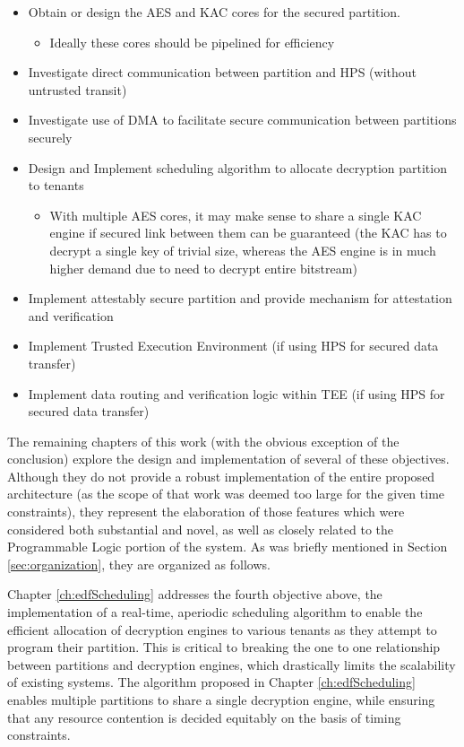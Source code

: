 \begin{itemize}
  \item Obtain or design the AES and KAC cores for the secured partition.
    \begin{itemize}  
      \item Ideally these cores should be pipelined for efficiency
    \end{itemize}
  \item Investigate direct communication between partition and HPS (without untrusted transit)
  \item Investigate use of DMA to facilitate secure communication between partitions securely
  \item Design and Implement scheduling algorithm to allocate decryption partition to tenants
    \begin{itemize}
      \item With multiple AES cores, it may make sense to share a single KAC engine if secured link between them can be guaranteed (the KAC has to decrypt a single key of trivial size, whereas the AES engine is in much higher demand due to need to decrypt entire bitstream)
    \end{itemize}
  \item Implement attestably secure partition and provide mechanism for attestation and verification
  \item Implement Trusted Execution Environment (if using HPS for secured data transfer)
  \item Implement data routing and verification logic within TEE (if using HPS for secured data transfer)
  \end{itemize}

The remaining chapters of this work (with the obvious exception of the conclusion) explore the design and implementation of several of these objectives. Although they do not provide a robust implementation of the entire proposed architecture (as the scope of that work was deemed too large for the given time constraints), they represent the elaboration of those features which were considered both substantial and novel, as well as closely related to the Programmable Logic portion of the system. As was briefly mentioned in Section \ref{sec:organization}, they are organized as follows.

Chapter \ref{ch:edfScheduling} addresses the fourth objective above, the implementation of a real-time, aperiodic scheduling algorithm to enable the efficient allocation of decryption engines to various tenants as they attempt to program their partition. This is critical to breaking the one to one relationship between partitions and decryption engines, which drastically limits the scalability of existing systems. The algorithm proposed in Chapter \ref{ch:edfScheduling} enables multiple partitions to share a single decryption engine, while ensuring that any resource contention is decided equitably on the basis of timing constraints.


